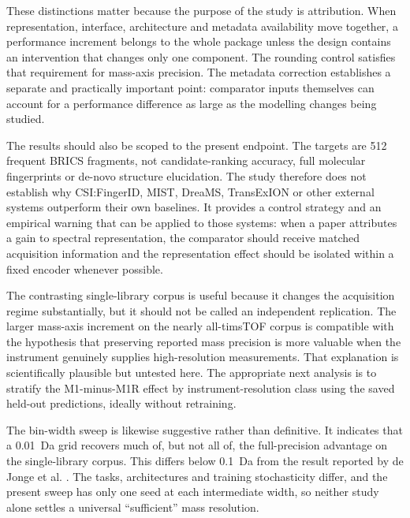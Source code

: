 \documentclass[11pt]{article}
\begin{document}
These distinctions matter because the purpose of the study is attribution. When representation, interface, architecture and metadata availability move together, a performance increment belongs to the whole package unless the design contains an intervention that changes only one component. The rounding control satisfies that requirement for mass-axis precision. The metadata correction establishes a separate and practically important point: comparator inputs themselves can account for a performance difference as large as the modelling changes being studied.

The results should also be scoped to the present endpoint. The targets are 512 frequent BRICS fragments, not candidate-ranking accuracy, full molecular fingerprints or de-novo structure elucidation. The study therefore does not establish why CSI:FingerID, MIST, DreaMS, TransExION or other external systems outperform their own baselines. It provides a control strategy and an empirical warning that can be applied to those systems: when a paper attributes a gain to spectral representation, the comparator should receive matched acquisition information and the representation effect should be isolated within a fixed encoder whenever possible.

The contrasting single-library corpus is useful because it changes the acquisition regime substantially, but it should not be called an independent replication. The larger mass-axis increment on the nearly all-timsTOF corpus is compatible with the hypothesis that preserving reported mass precision is more valuable when the instrument genuinely supplies high-resolution measurements. That explanation is scientifically plausible but untested here. The appropriate next analysis is to stratify the M1-minus-M1R effect by instrument-resolution class using the saved held-out predictions, ideally without retraining.

The bin-width sweep is likewise suggestive rather than definitive. It indicates that a 0.01~Da grid recovers much of, but not all of, the full-precision advantage on the single-library corpus. This differs below 0.1~Da from the result reported by de Jonge et al. \cite{dejonge2026cross}. The tasks, architectures and training stochasticity differ, and the present sweep has only one seed at each intermediate width, so neither study alone settles a universal ``sufficient'' mass resolution.
\end{document}
